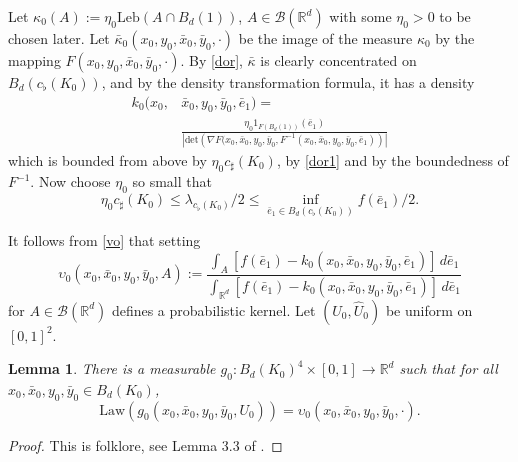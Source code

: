 \documentclass{article}
\newtheorem{lemma}[theorem]{Lemma}
\begin{document}
Let $\kappa_{0}(A):=\eta_{0} \mathrm{Leb}(A\cap B_{d}(1))$, $A\in\mathcal{B}(\mathbb{R}^{d})$ 
with some $\eta_{0}>0$ to be chosen
later. Let $\bar{\kappa}_{0}(x_{0},y_{0},\bar{x}_{0},\bar{y}_{0},\cdot)$ be the image of the measure $\kappa_{0}$
by the mapping $F(x_{0},y_{0},\bar{x}_{0},\bar{y}_{0},\cdot)$.{}
By \eqref{dor}, $\bar{\kappa}$ is clearly concentrated on
$B_{d}(c_\flat(K_{0}))$, and by the density transformation formula,
it has a density 
\begin{align*}
  k_{0}(x_{0},&\bar{x}_{0},y_{0},\bar{y}_{0},\bar{e}_1)=\\
  &\frac{\eta_{0} 1_{F(B_d(1))}(\bar{e}_1) }
{\left|\mathrm{det}\left(\nabla F(x_{0},\bar{x}_{0},y_{0},\bar{y}_{0},F^{-1}(x_{0},\bar{x}_{0},y_{0},\bar{y}_{0},\bar{e}_1)
\right)\right|}
\end{align*}
which is bounded from above by $\eta_{0} c_{\sharp}(K_{0})$, by \eqref{dor1} and by the boundedness of $F^{-1}$.
Now choose $\eta_{0}$ so small that
\begin{equation}\label{vo}
\eta_{0} c_{\sharp}(K_{0})\leq \lambda_{c_\flat(K_{0})}/2\leq\inf_{\bar{e}_1\in B_d(c_{\flat}(K_{0}))}f(\bar{e}_1)/2.
\end{equation}

It follows from \eqref{vo} that setting
$$
\upsilon_0(x_{0},\bar{x}_{0},y_{0},\bar{y}_{0}, A) \! := \! \frac{\int_A [f(\bar{e}_1) \!-\! k_{0}(x_{0},\bar{x}_{0},y_{0},\bar{y}_{0},\bar{e}_1)]
\, d\bar{e}_1}{\int_{\mathbb{R}^{d}} [f(\bar{e}_1) \!-\! k_{0}(x_{0},\bar{x}_{0},y_{0},\bar{y}_{0},\bar{e}_1)]\, d\bar{e}_1}
$$
for $A\in\mathcal{B}(\mathbb{R}^{d})$ defines a probabilistic kernel.
Let $(U_{0},\hat{U}_{0})$ be uniform on $[0,1]^{2}$.

\begin{lemma}\label{consu} There is a measurable
$g_0:B_d(K_{0})^4\times [0,1]\to \mathbb{R}^{d}$ such that for all $x_{0},\bar{x}_{0},y_{0},\bar{y}_{0}\in B_{d}(K_{0})$,
$$
\mathrm{Law}(g_0(x_{0},\bar{x}_{0},y_{0},\bar{y}_{0},U_{0}))=\upsilon_0(x_{0},\bar{x}_{0},y_{0},\bar{y}_{0}, \cdot).{}
$$    
\end{lemma} 
\begin{proof} This is folklore, see Lemma 3.3 of \cite{saga-ld}.
\end{proof}
\end{document}
